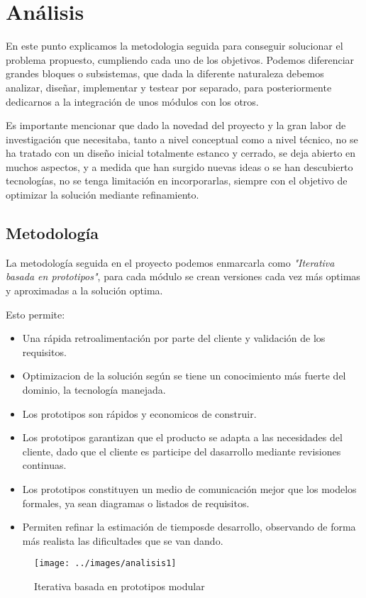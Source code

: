 \chapter{Análisis}

\bigskip
En este punto explicamos la metodologia seguida para conseguir  solucionar el problema propuesto, cumpliendo cada uno de los objetivos. 
Podemos diferenciar grandes bloques o subsistemas, que dada la diferente naturaleza debemos analizar, diseñar, implementar y testear por separado, para posteriormente dedicarnos a la integración de unos módulos con los otros.

\bigskip
Es importante mencionar que dado la novedad del proyecto y la gran labor de investigación que necesitaba, tanto a nivel conceptual como a nivel técnico, no se ha tratado con un diseño inicial totalmente estanco y cerrado, se deja abierto en muchos aspectos, y a medida que han surgido nuevas ideas o se han descubierto tecnologías, no se tenga limitación en incorporarlas, siempre con el objetivo de  optimizar la solución mediante refinamiento.


\section{Metodología}


\bigskip
La metodología seguida en el proyecto podemos enmarcarla como \textit{"Iterativa basada en prototipos"}, para cada módulo se crean versiones 
cada vez más optimas y aproximadas a la solución optima.

Esto permite:

\begin{itemize}
	\item Una rápida retroalimentación por parte del cliente y validación de los requisitos. 
	\item Optimizacion de la solución según se tiene un conocimiento más fuerte del dominio, la tecnología manejada.
	\item Los prototipos son rápidos y economicos de construir.
	\item Los prototipos garantizan que el producto se adapta a las necesidades del cliente, dado que el cliente es participe del dasarrollo mediante revisiones continuas. 
	\item Los prototipos constituyen un medio de comunicación mejor que los modelos formales, ya sean diagramas o listados de requisitos. 
	\item Permiten refinar la estimación de tiemposde desarrollo, observando de forma más realista las dificultades que se van dando.  
	
\end{itemize}

\begin{figure}[h]
	\centering
	\texttt{[image: ../images/analisis1]}
	\caption[Iterativa basada en prototipos modular]{Iterativa basada en prototipos modular}
	\label{fig:}
\end{figure}
\newpage



  

